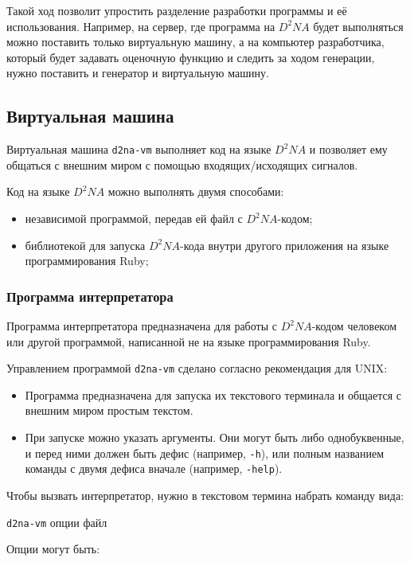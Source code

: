 \documentclass[utf8,a5paper,portrait,12pt]{eskdtext}
\begin{document}
Такой ход позволит упростить разделение разработки программы и её использования.
Например, на сервер, где программа на $D^2NA$ будет выполняться можно поставить
только виртуальную машину, а на компьютер разработчика, который будет задавать
оценочную функцию и следить за ходом генерации, нужно поставить и генератор и
виртуальную машину.

\subsection{Виртуальная машина}

Виртуальная машина \texttt{d2na-vm} выполняет код на языке $D^2NA$ и позволяет
ему общаться с внешним миром с помощью входящих/исходящих сигналов.

Код на языке $D^2NA$ можно выполнять двумя способами:
\begin{itemize}
  \item независимой программой, передав ей файл с $D^2NA$-кодом;
  \item библиотекой для запуска $D^2NA$-кода внутри другого приложения на языке
        программирования Ruby;
\end{itemize}

\subsubsection{Программа интерпретатора}

Программа интерпретатора предназначена для работы с $D^2NA$-кодом человеком или
другой программой, написанной не на языке программирования Ruby.

Управлением программой \texttt{d2na-vm} сделано согласно рекомендация для
UNIX:
\begin{itemize}
  \item Программа предназначена для запуска их текстового терминала и общается
        с внешним миром простым текстом.
  \item При запуске можно указать аргументы. Они могут быть либо однобуквенные,
        и перед ними должен быть дефис (например, \texttt{-h}), или полным
        названием команды с двумя дефиса вначале (например, \texttt{-help}).
\end{itemize}

Чтобы вызвать интерпретатор, нужно в текстовом термина набрать команду вида:

\texttt{d2na-vm} опции файл

Опции могут быть:
\end{document}
